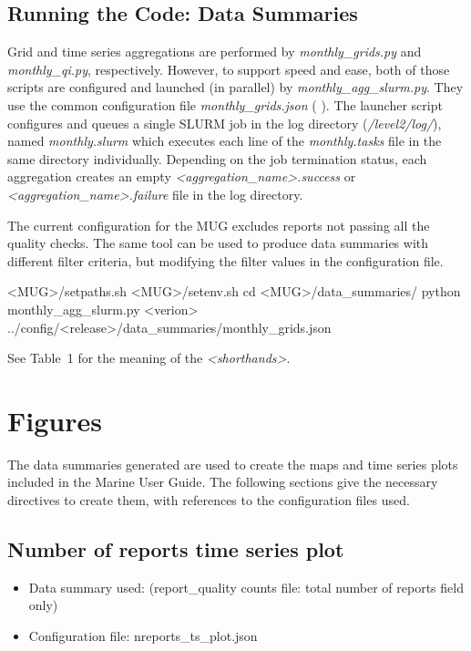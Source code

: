 \documentclass[letterpaper,10pt,english]{sphinxmanual}
\begin{document}
\subsection{Running the Code: Data Summaries}
Grid and time series aggregations are performed by \textit{monthly\_grids.py} and \textit{monthly\_qi.py}, respectively. 
However, to support speed and ease, both of those scripts are configured and launched (in parallel) by \textit{monthly\_agg\_slurm.py}. 
They use the common configuration file \textit{monthly\_grids.json} ( {\hyperref[\detokenize{index:mon-grids-um}]{}}). 
The launcher script configures and queues a single SLURM job in the log directory (\textit{/level2/log/}), named \textit{monthly.slurm} which executes each line of the \textit{monthly.tasks} file in the same directory individually.
Depending on the job termination status, each aggregation creates an empty \textit{<aggregation\_name>.success} or \textit{<aggregation\_name>.failure} file in the log directory.

The current configuration for the MUG excludes reports not passing all the quality checks. 
The same tool can be used to produce data summaries with different filter criteria, but modifying the filter values in the configuration file.

\begin{sphinxVerbatim}[commandchars=\\\{\}]
 <MUG>/setpaths.sh
 <MUG>/setenv.sh
cd <MUG>/data\_summaries/
python monthly\_agg\_slurm.py <verion> ../config/<release>/data\_summaries/monthly\_grids.json
\end{sphinxVerbatim}

See Table~1 for the meaning of the \textit{<shorthands>}.

\section{Figures}
\label{\detokenize{index:figures}}
The data summaries generated are used to create the maps and time series plots
included in the Marine User Guide. The following sections give the necessary
directives to create them, with references to the configuration files used.


\subsection{Number of reports time series plot}
\label{\detokenize{index:number-of-reports-time-series-plot}}\begin{itemize}
\item {} 
Data summary used: {\hyperref[\detokenize{index:qi-counts-um-section}]{}} (report\_quality counts file: total number of reports field only)

\item {} 
Configuration file: nreports\_ts\_plot.json

\end{itemize}
\end{document}
